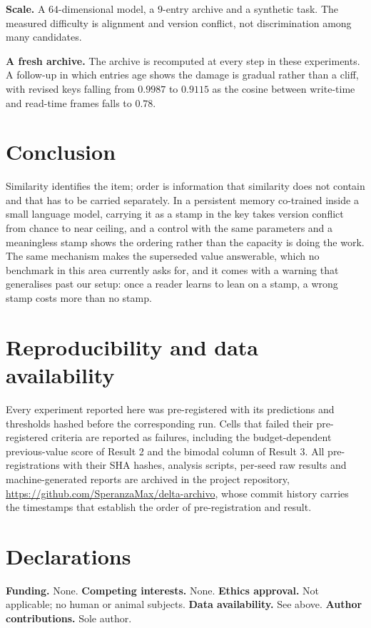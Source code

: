 \documentclass[11pt,a4paper]{article}
\begin{document}
\textbf{Scale.} A $64$-dimensional model, a $9$-entry archive and a synthetic task. The measured
difficulty is alignment and version conflict, not discrimination among many candidates.

\textbf{A fresh archive.} The archive is recomputed at every step in these experiments. A follow-up in
which entries age shows the damage is gradual rather than a cliff, with revised keys falling from
$0.9987$ to $0.9115$ as the cosine between write-time and read-time frames falls to $0.78$.

\section{Conclusion}

Similarity identifies the item; order is information that similarity does not contain and that has to
be carried separately. In a persistent memory co-trained inside a small language model, carrying it as
a stamp in the key takes version conflict from chance to near ceiling, and a control with the same
parameters and a meaningless stamp shows the ordering rather than the capacity is doing the work. The
same mechanism makes the superseded value answerable, which no benchmark in this area currently asks
for, and it comes with a warning that generalises past our setup: once a reader learns to lean on a
stamp, a wrong stamp costs more than no stamp.

\section*{Reproducibility and data availability}

Every experiment reported here was pre-registered with its predictions and thresholds hashed before
the corresponding run. Cells that failed their pre-registered criteria are reported as failures,
including the budget-dependent previous-value score of Result 2 and the bimodal column of Result 3.
All pre-registrations with their SHA hashes, analysis scripts, per-seed raw results and
machine-generated reports are archived in the project repository,
\url{https://github.com/SperanzaMax/delta-archivo}, whose commit history carries the timestamps that
establish the order of pre-registration and result.

\section*{Declarations}

\textbf{Funding.} None. \textbf{Competing interests.} None. \textbf{Ethics approval.} Not applicable;
no human or animal subjects. \textbf{Data availability.} See above. \textbf{Author contributions.}
Sole author.
\end{document}
